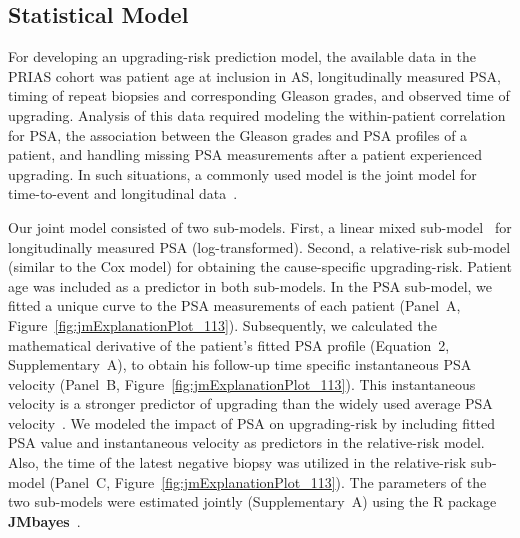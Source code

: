 \subsection{Statistical Model}
For developing an upgrading-risk prediction model, the available data in the PRIAS cohort was patient age at inclusion in AS, longitudinally measured PSA, timing of repeat biopsies and corresponding Gleason grades, and observed time of upgrading. Analysis of this data required modeling the within-patient correlation for PSA, the association between the Gleason grades and PSA profiles of a patient, and handling missing PSA measurements after a patient experienced upgrading. In such situations, a commonly used model is the joint model for time-to-event and longitudinal data~\citep{tomer2019,coley2017prediction,rizopoulos2012joint}.

Our joint model consisted of two sub-models. First, a linear mixed sub-model~\citep{laird1982random} for longitudinally measured PSA (log-transformed). Second, a relative-risk sub-model (similar to the Cox model) for obtaining the cause-specific upgrading-risk. Patient age was included as a predictor in both sub-models. In the PSA sub-model, we fitted a unique curve to the PSA measurements of each patient (Panel~A, Figure~\ref{fig:jmExplanationPlot_113}). Subsequently, we calculated the mathematical derivative of the patient's fitted PSA profile (Equation~2, Supplementary~A), to obtain his follow-up time specific instantaneous PSA velocity (Panel~B, Figure~\ref{fig:jmExplanationPlot_113}). This instantaneous velocity is a stronger predictor of upgrading than the widely used average PSA velocity~\citep{cooperberg2018refined}. We modeled the impact of PSA on upgrading-risk by including fitted PSA value and instantaneous velocity as predictors in the relative-risk model. Also, the time of the latest negative biopsy was utilized in the relative-risk sub-model (Panel~C, Figure~\ref{fig:jmExplanationPlot_113}). The parameters of the two sub-models were estimated jointly (Supplementary~A) using the R package \textbf{JMbayes}~\citep{rizopoulosJMbayes}. 

